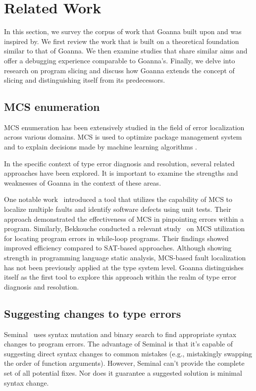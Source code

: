 \documentclass[pdflatex,lineno,sn-nature,Numbered]{sn-jnl}%
\begin{document}
\section{Related Work} 
    \label{sec:related-work}
    In this section, we survey the corpus of work that Goanna built upon and was inspired by. We first review the work that is built on a theoretical foundation similar to that of Goanna. We then examine studies that share similar aims and offer a debugging experience comparable to Goanna's. Finally, we delve into research on program slicing and discuss how Goanna extends the concept of slicing and distinguishing itself from its predecessors.

    \subsection{MCS enumeration}
	
    MCS enumeration has been extensively studied in the field of error localization across various domains. MCS is used to optimize package management system \cite{Ignatiev2014-nr} and to explain decisions made by machine learning algorithms \cite{Marques-Silva2023-nk}.
    
    
    In the specific context of type error diagnosis and resolution, several related approaches have been explored. It is important to examine the strengths and weaknesses of Goanna in the context of these areas.

One notable work~\cite{Lamraoui2016-wr} introduced a tool that utilizes the capability of MCS to localize multiple faults and identify software defects using unit tests. Their approach demonstrated the effectiveness of MCS in pinpointing errors within a program. Similarly, Bekkouche conducted a relevant study~\cite{Bekkouche2015-is}  on MCS utilization for locating program errors in while-loop programs. Their findings showed improved efficiency compared to SAT-based approaches. Although showing strength in programming language static analysis, MCS-based fault localization has not been previously applied at the type system level. Goanna distinguishes itself as the first tool to explore this approach within the realm of type error diagnosis and resolution.
    

\subsection{Suggesting changes to type errors}

Seminal~\cite{Lerner2007-yq} uses syntax mutation and binary search to find appropriate syntax changes to program errors. The advantage of Seminal is that it's capable of suggesting direct syntax changes to common mistakes (e.g., mistakingly swapping the order of function arguments). However, Seminal can't provide the complete set of all potential fixes. Nor does it guarantee a suggested solution is minimal syntax change.
   
\end{document}
